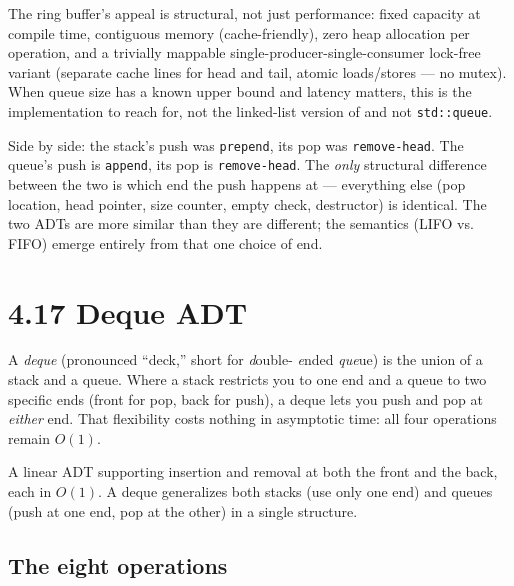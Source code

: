 \documentclass[11pt]{article}
\begin{document}
\begin{notebox}
The ring buffer's appeal is structural, not just performance:
fixed capacity at compile time, contiguous memory (cache-friendly),
zero heap allocation per operation, and a trivially mappable
single-producer-single-consumer lock-free variant (separate cache
lines for head and tail, atomic loads/stores --- no mutex). When
queue size has a known upper bound and latency matters, this is
the implementation to reach for, not the linked-list version of
 and not \texttt{std::queue}.
\end{notebox}

\begin{ideabox}
Side by side: the stack's push was \texttt{prepend}, its pop was
\texttt{remove-head}. The queue's push is \texttt{append}, its
pop is \texttt{remove-head}. The \emph{only} structural
difference between the two is which end the push happens at ---
everything else (pop location, head pointer, size counter, empty
check, destructor) is identical. The two ADTs are more similar
than they are different; the semantics (LIFO vs. FIFO) emerge
entirely from that one choice of end.
\end{ideabox}

\section{4.17 Deque ADT}

A \emph{deque} (pronounced ``deck,'' short for \emph{d}ouble-
\emph{e}nded \emph{que}ue) is the union of a stack and a queue.
Where a stack restricts you to one end and a queue to two specific
ends (front for pop, back for push), a deque lets you push and pop
at \emph{either} end. That flexibility costs nothing in asymptotic
time: all four operations remain $O(1)$.

\begin{defnbox}[Deque]
A linear ADT supporting insertion and removal at both the front
and the back, each in $O(1)$. A deque generalizes both stacks
(use only one end) and queues (push at one end, pop at the other)
in a single structure.
\end{defnbox}

\subsection*{The eight operations}
\end{document}
